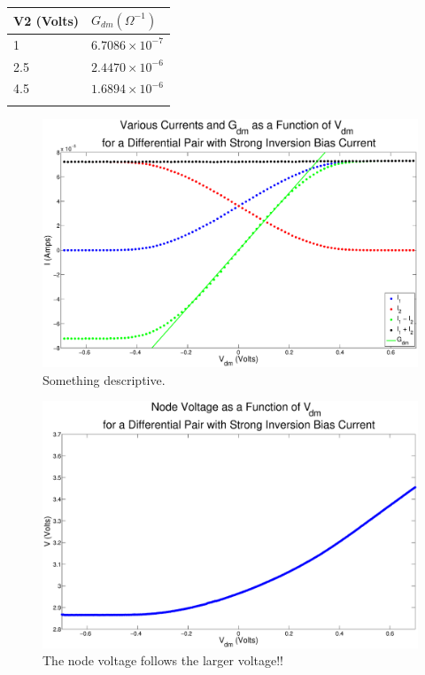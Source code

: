 \documentclass{article}
\begin{document}
\begin{table}[h]
\begin{center}
    \begin{tabular}{ l | l  }
        V2 (Volts) & $G_{dm} (\Omega^{-1})$ \\
        \hline
        1 & $6.7086 \times 10^{-7}$ \\
        2.5 & $2.4470 \times 10^{-6}$ \\
        4.5 & $1.6894 \times 10^{-6}$ \\
        \label{tb:gdm}
    \end{tabular}
\end{center}
\end{table}




\begin{figure}[H]
\centering
\includegraphics[width=\linewidth]{./Figures/AllCurrentsStrongInversion.eps}
\caption{Something descriptive. }
\label{fig:AllCurrentsStrongInversion }
\end{figure}


\begin{figure}[H]
\centering
\includegraphics[width=\linewidth]{./Figures/NodeVoltageStrongInversion.eps}
\caption{The node voltage follows the larger voltage!!}
\label{fig:nodevoltageSI}
\end{figure}
\end{document}
